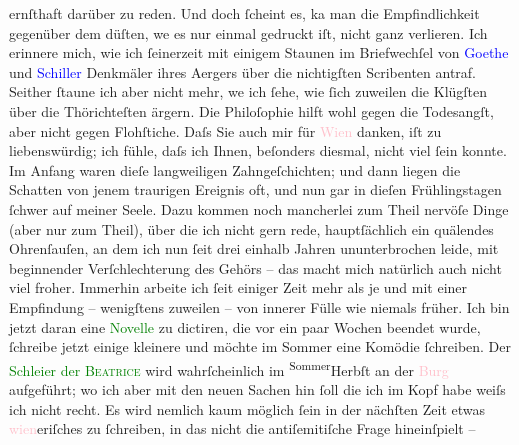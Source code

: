                ernſthaft darüber zu reden. Und doch ſcheint es, ka{\geminationn} man
               die Empfindlichkeit gegenüber dem dü{\geminationm}ſten, we{\geminationn} es nur einmal gedruckt iſt, nicht ganz verlieren. Ich
               erinnere mich, wie ich ſeinerzeit mit einigem Staunen im Briefwechſel von \textcolor{blue}{Goethe}{}\ledrightnote{\textcolor{blue}{Johann Wolfgang von Goethe}} und \textcolor{blue}{Schiller}{}\ledrightnote{\textcolor{blue}{Friedrich von Schiller}} Denkmäler ihres Aergers über die nichtigſten Scribenten antraf.
               Seither ſtaune ich {\pb}aber nicht mehr, we{\geminationn} ich ſehe, wie ſich zuweilen die Klügſten über die
               Thörichteſten ärgern. Die Philoſophie hilft wohl gegen die Todesangſt, aber nicht
               gegen Flohſtiche.\pend
           \pstart
           Daſs Sie auch mir für \textcolor{pink}{Wien}{}\ledrightnote{\textcolor{pink}{Wien}} danken, iſt zu
               liebenswürdig; ich fühle, daſs ich Ihnen, beſonders diesmal, nicht viel ſein konnte.
               Im Anfang waren dieſe langweiligen Zahngeſchichten; und dann liegen die Schatten von
               jenem traurigen Ereignis oft, und nun gar in dieſen Frühlingstagen ſchwer auf meiner
               Seele. Dazu kommen noch mancherlei zum {\pb}Theil
               nervöſe Dinge (aber nur zum Theil), über die ich nicht gern rede, hauptſächlich ein
               quälendes Ohrenſauſen, an dem ich nun ſeit drei einhalb Jahren ununterbrochen leide,
               mit beginnender Verſchlechterung des Gehörs – das macht mich natürlich auch nicht
               viel froher. Immerhin arbeite ich ſeit einiger Zeit mehr als je und mit einer
               Empfindung – wenigſtens zuweilen – von innerer Fülle wie niemals früher. Ich bin
               jetzt daran eine \textcolor{green}{Novelle}{} zu
               dictiren, die vor ein paar Wochen beendet wurde, ſchreibe jetzt einige {\pb}kleinere und möchte im Sommer eine Komödie
               ſchreiben. Der \textcolor{green}{Schleier der \textsc{Beatrice}}{}\ledrightnote{\textcolor{green}{Der Schleier der Beatrice. Schauspiel in fünf Akten}} wird wahrſcheinlich im \substVorne{}\textsuperscript{Sommer}{\allowbreak}\substDazwischen{}Herbſt\substHinten{} an der \textcolor{pink}{Burg}{}\ledrightnote{\textcolor{pink}{Burgtheater}} aufgeführt; wo ich aber mit den
               neuen Sachen hin ſoll die ich im Kopf habe weiſs ich nicht recht. Es wird nemlich
               kaum möglich ſein in der nächſten Zeit etwas \textcolor{pink}{wien}{}\ledrightnote{\textcolor{pink}{Wien}}eriſches zu ſchreiben, in das nicht die antiſemitiſche Frage hineinſpielt –
